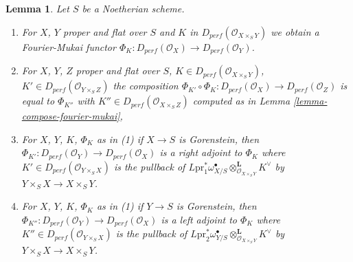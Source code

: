 \documentclass{stacks-project}
\theoremstyle{plain}
\newtheorem{lemma}[subsection]{Lemma}
\theoremstyle{definition}
\theoremstyle{remark}
\numberwithin{equation}{subsection}
\begin{document}
\begin{lemma}
\label{lemma-fourier-mukai-flat-proper-over-noetherian}
Let $S$ be a Noetherian scheme.
\begin{enumerate}
\item For $X$, $Y$ proper and flat over $S$ and $K$ in
$D_{perf}(\mathcal{O}_{X \times_S Y})$ we obtain a Fourier-Mukai functor
$\Phi_K : D_{perf}(\mathcal{O}_X) \to D_{perf}(\mathcal{O}_Y)$.
\item For $X$, $Y$, $Z$ proper and flat over $S$, $K \in
D_{perf}(\mathcal{O}_{X \times_S Y})$, $K' \in
D_{perf}(\mathcal{O}_{Y \times_S Z})$ the composition
$\Phi_{K'} \circ \Phi_K : D_{perf}(\mathcal{O}_X) \to D_{perf}(\mathcal{O}_Z)$
is equal to $\Phi_{K''}$ with $K'' \in D_{perf}(\mathcal{O}_{X \times_S Z})$
computed as in Lemma \ref{lemma-compose-fourier-mukai},
\item For $X$, $Y$, $K$, $\Phi_K$ as in (1) if $X \to S$ is Gorenstein, then
$\Phi_{K'} : D_{perf}(\mathcal{O}_Y) \to D_{perf}(\mathcal{O}_X)$ is a right
adjoint to $\Phi_K$ where $K' \in D_{perf}(\mathcal{O}_{Y \times_S X})$
is the pullback of $L\text{pr}_1^*\omega_{X/S}^\bullet
\otimes_{\mathcal{O}_{X \times_S Y}}^\mathbf{L} K^\vee$ by
$Y \times_S X \to X \times_S Y$.
\item For $X$, $Y$, $K$, $\Phi_K$ as in (1) if $Y \to S$ is Gorenstein, then
$\Phi_{K''} : D_{perf}(\mathcal{O}_Y) \to D_{perf}(\mathcal{O}_X)$ is a left
adjoint to $\Phi_K$ where $K'' \in D_{perf}(\mathcal{O}_{Y \times_S X})$
is the pullback of $L\text{pr}_2^*\omega_{Y/S}^\bullet
\otimes_{\mathcal{O}_{X \times_S Y}}^\mathbf{L} K^\vee$ by
$Y \times_S X \to X \times_S Y$.
\end{enumerate}
\end{lemma}
\end{document}
